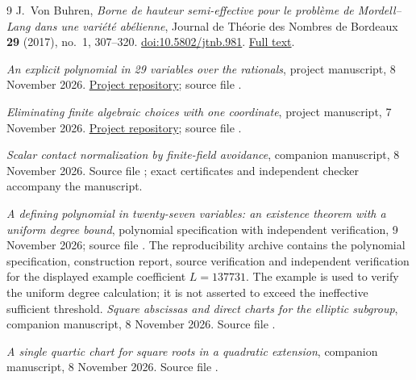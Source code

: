 \documentclass[11pt,a4paper]{article}
\begin{document}
\begingroup\small
\begin{thebibliography}{9}
\setlength{\itemsep}{2pt}
\setlength{\parskip}{0pt}
J.~Von Buhren, \emph{Borne de hauteur semi-effective pour le
probl\`eme de Mordell--Lang dans une vari\'et\'e ab\'elienne},
Journal de Th\'eorie des Nombres de Bordeaux
\textbf{29} (2017), no.~1, 307--320.
\href{https://doi.org/10.5802/jtnb.981}{doi:10.5802/jtnb.981}.
\href{https://www.numdam.org/item/10.5802/jtnb.981.pdf}{Full text}.

\emph{An explicit polynomial in 29 variables over the rationals},
project manuscript, 8 November 2026.
\href{https://github.com/JoseBrox/diophantine-z-q_improvements}{Project repository};
source file .

\emph{Eliminating finite algebraic choices with one coordinate},
project manuscript, 7 November 2026.
\href{https://github.com/JoseBrox/diophantine-z-q_improvements}{Project repository};
source file .

\emph{Scalar contact normalization by finite-field avoidance},
companion manuscript, 8 November 2026.
Source file ;
exact certificates and independent checker accompany the manuscript.

\emph{A defining polynomial in twenty-seven variables:
an existence theorem with a uniform degree bound},
polynomial specification with independent verification,
9 November 2026; source file
.
The reproducibility archive contains the polynomial
specification, construction report, source verification and
independent verification for the displayed example coefficient
$L=137731$. The example is used to verify the uniform degree
calculation; it is not asserted to exceed the ineffective
sufficient threshold.
\emph{Square abscissas and direct charts for the elliptic subgroup},
companion manuscript, 8 November 2026.
Source file .

\emph{A single quartic chart for square roots in a quadratic extension},
companion manuscript, 8 November 2026.
Source file .
\end{thebibliography}
\endgroup
\end{document}
